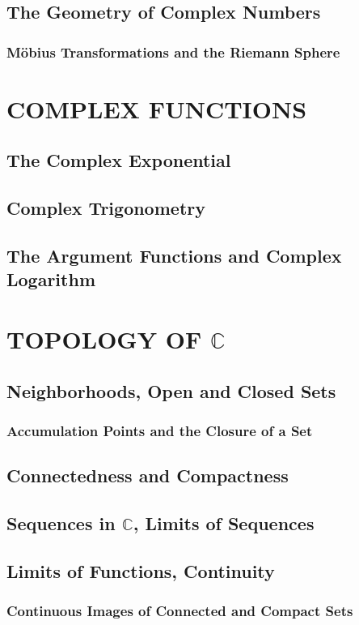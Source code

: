 \documentclass{refbook}
\begin{document}
  \subsection{The Geometry of Complex Numbers}
  \subsubsection{Möbius Transformations and the Riemann Sphere}


  \section{COMPLEX FUNCTIONS}
  \subsection{The Complex Exponential}
  \subsection{Complex Trigonometry}
  \subsection{The Argument Functions and Complex Logarithm}


  \section{TOPOLOGY OF $\mathbb{C}$}
  \subsection{Neighborhoods, Open and Closed Sets}
  \subsubsection{Accumulation Points and the Closure of a Set}
  \subsection{Connectedness and Compactness}
  \subsection{Sequences in $\mathbb{C}$, Limits of Sequences}
  \subsection{Limits of Functions, Continuity}
  \subsubsection{Continuous Images of Connected and Compact Sets}
\end{document}
